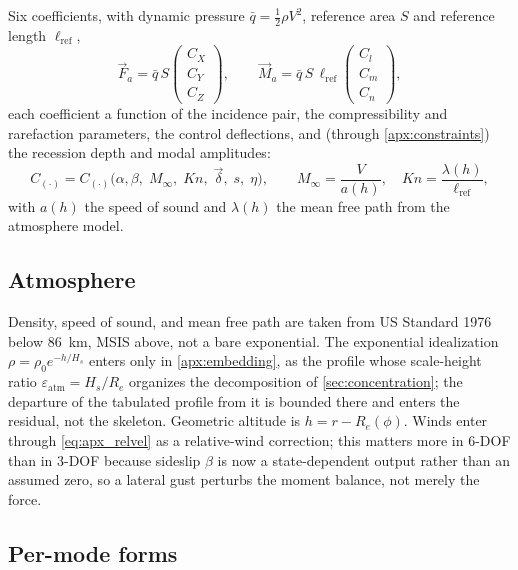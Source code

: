 Six coefficients, with dynamic pressure $\bar q=\tfrac12\rho V^2$,
reference area $S$ and reference length $\ell_{\mathrm{ref}}$,
\begin{equation}
\label{eq:apx_aeroFM}
\vec F_a=\bar q\,S
\begin{pmatrix}C_X\\ C_Y\\ C_Z\end{pmatrix},\qquad
\vec M_a=\bar q\,S\,\ell_{\mathrm{ref}}
\begin{pmatrix}C_l\\ C_m\\ C_n\end{pmatrix},
\end{equation}
each coefficient a function of the incidence pair, the compressibility and
rarefaction parameters, the control deflections, and (through
\cref{apx:constraints}) the recession depth and modal amplitudes:
\begin{equation}
\label{eq:apx_coeffdep}
C_{(\cdot)}=C_{(\cdot)}\bigl(\alpha,\beta,\;M_\infty,\;Kn,\;\vec\delta,\;s,\;\eta\bigr),
\qquad
M_\infty=\frac{V}{a(h)},\quad Kn=\frac{\lambda(h)}{\ell_{\mathrm{ref}}},
\end{equation}
with $a(h)$ the speed of sound and $\lambda(h)$ the mean free path from the
atmosphere model.

\subsection{Atmosphere}
\label{sub:apx_atmosphere}

Density, speed of sound, and mean free path are taken from US Standard 1976 
below $86$~km, MSIS above, not a bare exponential. The exponential idealization
$\rho=\rho_0 e^{-h/H_s}$ enters only in \cref{apx:embedding}, as the profile
whose scale-height ratio $\varepsilon_{\mathrm{atm}}=H_s/R_e$ organizes the
decomposition of \cref{sec:concentration}; the departure of the tabulated
profile from it is bounded there and enters the residual, not the skeleton.
Geometric altitude is $h=r-R_e(\phi)$. Winds enter through
\cref{eq:apx_relvel} as a relative-wind correction; this matters more in
$6$-DOF than in $3$-DOF because sideslip $\beta$ is now a state-dependent
output rather than an assumed zero, so a lateral gust perturbs the moment
balance, not merely the force.


\subsection{Per-mode forms}
\label{sub:apx_per_mode_forms}
